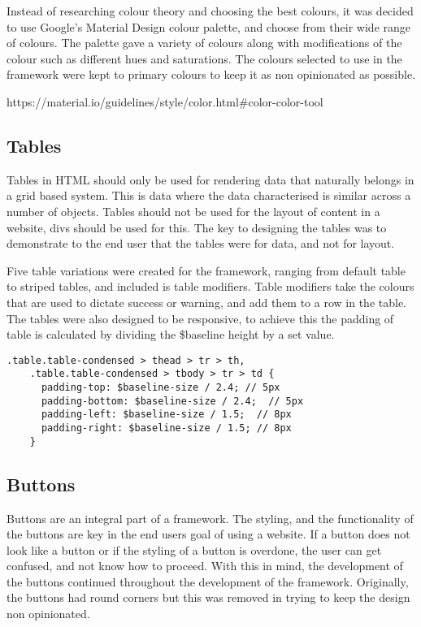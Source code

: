 Instead of researching colour theory and choosing the best colours, it was decided to use Google's Material Design colour palette, and choose from their wide range of colours. The palette  gave a variety of colours along with modifications of the colour such as different hues and saturations. The colours selected to use in the framework were kept to primary colours to keep it as non opinionated as possible.


https://material.io/guidelines/style/color.html#color-color-tool


\subsection{Tables}

Tables in HTML should only be used for rendering data that naturally belongs in a grid based system. This is data where the data characterised is similar across a number of objects. Tables should not be used for the layout of content in a website, divs should be used for this. The key to designing the tables was to demonstrate to the end user that the tables were for data, and not for layout.

Five table variations were created for the framework, ranging from default table to striped tables, and included is table modifiers. Table modifiers take the colours that are used to dictate success or warning, and add them to a row in the table. The tables were also designed to be responsive, to achieve this the padding of table is calculated by dividing the \$baseline height by a set value. 

\begin{lstlisting}[language=CSS3]
    .table.table-condensed > thead > tr > th,
    .table.table-condensed > tbody > tr > td {
      padding-top: $baseline-size / 2.4; // 5px
      padding-bottom: $baseline-size / 2.4;  // 5px
      padding-left: $baseline-size / 1.5;  // 8px
      padding-right: $baseline-size / 1.5; // 8px
    }
\end{lstlisting}


\subsection{Buttons}
Buttons are an integral part of a framework. The styling, and the functionality of the buttons are key in the end users goal of using a website. If a button does not look like a button or if the styling of a button is overdone, the user can get confused, and not know how to proceed. With this in mind, the development of the buttons continued throughout the development of the framework. Originally, the buttons had round corners but this was removed in trying to keep the design non opinionated. 


